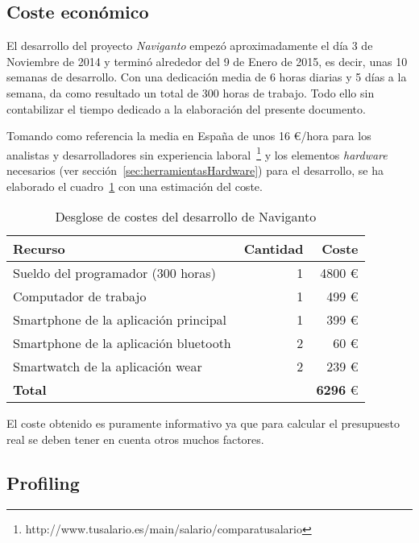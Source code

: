 \subsection{Coste económico}

El desarrollo del proyecto \emph{Naviganto} empezó aproximadamente el día 3 de Noviembre de 2014 y
terminó alrededor del 9 de Enero de 2015, es decir, unas 10 semanas de desarrollo. Con una
dedicación media de 6 horas diarias y 5 días a la semana, da como resultado un total de 300 horas de
trabajo. Todo ello sin contabilizar el tiempo dedicado a la elaboración del presente documento.

Tomando como referencia la media en España de unos 16 \euro/hora para los analistas y
desarrolladores sin experiencia
laboral~\footnote{http://www.tusalario.es/main/salario/comparatusalario} y los elementos
\emph{hardware} necesarios (ver sección~\ref{sec:herramientasHardware}) para el desarrollo, se ha
elaborado el cuadro~\ref{cuadro:costes} con una estimación del coste.

\begin{table}[h]
  \centering
  \begin{tabular}{|l|r|r|}
    \hline
    \textbf{Recurso} & \textbf{Cantidad} & \textbf{Coste} \\
    \hline
    Sueldo del programador (300 horas)     & 1 &          4800 \euro \\
    \hline
    Computador de trabajo                  & 1 &           499 \euro \\
    \hline
    Smartphone de la aplicación principal  & 1 &           399 \euro \\
    \hline
    Smartphone de la aplicación bluetooth  & 2 &            60 \euro \\
    \hline
    Smartwatch de la aplicación wear       & 2 &           239 \euro \\
    \hline
    \textbf{Total}                         &   & \textbf{6296} \euro \\
    \hline
  \end{tabular}
  \caption{Desglose de costes del desarrollo de Naviganto}
  \label{cuadro:costes}
\end{table}

El coste obtenido es puramente informativo ya que para calcular el presupuesto real se deben tener
en cuenta otros muchos factores.

\subsection{Profiling}

